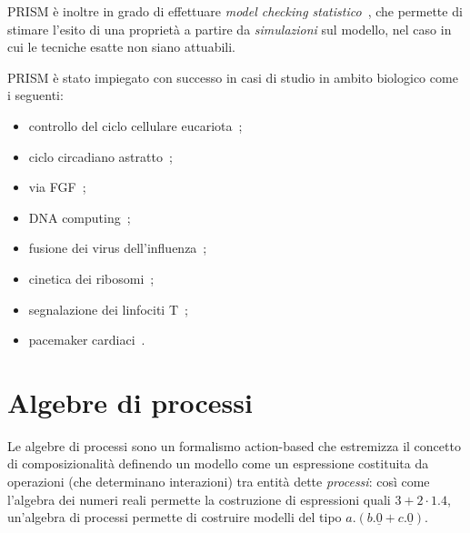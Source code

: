 		PRISM \`e inoltre in grado di effettuare \emph{model checking statistico}~\cite{kwiatkowska2018probabilistic}, che permette di stimare l'esito di una propriet\`a a partire da \emph{simulazioni} sul modello, nel caso in cui le tecniche esatte non siano attuabili.
		
		PRISM \`e stato impiegato con successo in casi di studio in ambito biologico come i seguenti:
		\begin{itemize}
			\item controllo del ciclo cellulare eucariota~\cite{cyclin};
			\item ciclo circadiano astratto~\cite{circadian};
			\item via FGF~\cite{heath2008probabilistic};
			\item DNA computing~\cite{dannenberg2013dna};
			\item fusione dei virus dell'influenza~\cite{dobay2011many};
			\item cinetica dei ribosomi~\cite{bovsnacki2009silico};
			\item segnalazione dei linfociti T~\cite{owens2008modelling};
			\item pacemaker cardiaci~\cite{chen2012quantitative}.
		\end{itemize}

	\section{Algebre di processi}\label{sez:processalgebra}
	Le algebre di processi sono un formalismo action-based che estremizza il concetto di composizionalit\`a definendo un modello come un espressione costituita da operazioni (che determinano interazioni) tra entit\`a dette \emph{processi}: cos\`i come l'algebra dei numeri reali permette la costruzione di espressioni quali $3 + 2 \cdot 1.4$, un'algebra di processi permette di costruire modelli del tipo $a.(b.\underline{0} + c.\underline{0})$.
	
